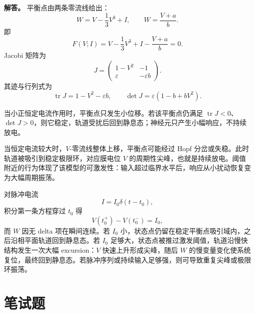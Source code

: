 ﻿\documentclass[UTF8,12pt]{ctexart}
\begin{document}
\begin{enumerate}[label=\textbf{\arabic*.},leftmargin=2.2em]
\textbf{解答。} 平衡点由两条零流线给出：
\[
W=V-\frac13V^3+I,
\qquad
W=\frac{V+a}{b}.
\]
即
\[
F(V;I)=V-\frac13V^3+I-\frac{V+a}{b}=0.
\]
Jacobi 矩阵为
\[
J=\begin{pmatrix}
1-V^2&-1\\
\varepsilon&-\varepsilon b
\end{pmatrix}.
\]
其迹与行列式为
\[
\operatorname{tr}J=1-V^2-
\varepsilon b,
\qquad
\det J=\varepsilon(1-b+bV^2).
\]

当小正恒定电流作用时，平衡点只发生小位移。若该平衡点仍满足 \(\operatorname{tr}J<0\)、\(\det J>0\)，则它稳定，轨道受扰后回到静息态；神经元只产生小幅响应，不持续放电。

当恒定电流较大时，\(V\)-零流线整体上移，平衡点可能经过 Hopf 分岔或失稳。此时轨道被吸引到稳定极限环，对应膜电位 \(V\) 的周期性尖峰，也就是持续放电。阈值附近的行为体现了该模型的可激发性：输入超过临界水平后，响应从小扰动恢复变为大幅周期振荡。

对脉冲电流
\[
I=I_0\delta(t-t_0),
\]
积分第一条方程穿过 \(t_0\) 得
\[
V(t_0^+)-V(t_0^-)=I_0,
\]
而 \(W\) 因无 delta 项在瞬间连续。若 \(I_0\) 小，状态点仍留在稳定平衡点吸引域内，之后沿相平面轨道回到静息态。若 \(I_0\) 足够大，状态点被推过激发阈值，轨道沿慢快结构发生一次大幅 excursion：\(V\) 快速上升形成尖峰，随后 \(W\) 的慢变量变化使系统复位，最终回到静息态。若脉冲序列或持续输入足够强，则可导致重复尖峰或极限环振荡。
\end{enumerate}
\section{笔试题}
\end{document}
